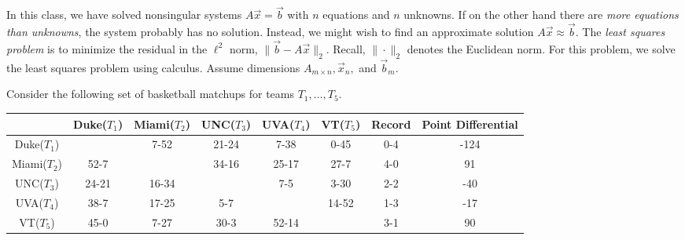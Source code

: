 \documentclass[addpoints, 11pt]{exam}
\newcommand{\ds}{\displaystyle}
\begin{document}
\begin{questions}

\question In this class, we have solved nonsingular systems $A\vec{x}=\vec{b}$ with $n$ equations and $n$ unknowns. If on the other hand there are \emph{more equations than unknowns}, the system probably has no solution. Instead, we might wish to find an approximate solution $A\vec{x}\approx \vec{b}$. The \emph{least squares problem} is to minimize the residual in the $\ell^2$ norm, $\ds \|\vec{b}-A\vec{x}\|_2$. Recall, $\|\cdot\|_2$ denotes the Euclidean norm. For this problem, we solve the least squares problem using calculus. Assume dimensions $\ds A_{m\times n}, \vec{x}_n,$ and $\vec{b}_m$.

\pagebreak

\question Consider the following set of basketball matchups for teams $T_1, \dots, T_5$. \vspace{-6mm}
\begin{center}
\begin{tabular}{|c|c|c|c|c|c|c|c|}
\hline
\	& Duke($T_1$) & Miami($T_2$) & UNC($T_3$) & UVA($T_4$) & VT($T_5$) & Record & Point Differential \\
\hline
Duke($T_1$) &	& 7-52 & 21-24 & 7-38 & 0-45 & 0-4 & -124\\
\hline
Miami($T_2$) & 52-7 &	& 34-16 & 25-17 & 27-7 & 4-0 & 91\\
\hline
UNC($T_3$)  & 24-21 & 16-34 &	& 7-5 & 3-30 & 2-2 & -40\\
\hline
UVA($T_4$)   & 38-7 & 17-25 & 5-7 &	& 14-52 & 1-3 & -17\\
\hline
VT($T_5$)     & 45-0 & 7-27 & 30-3 & 52-14 &	& 3-1 & 90\\
\hline
\end{tabular}
\end{center}
\begin{parts}

\end{parts}
\end{questions}
\end{document}
